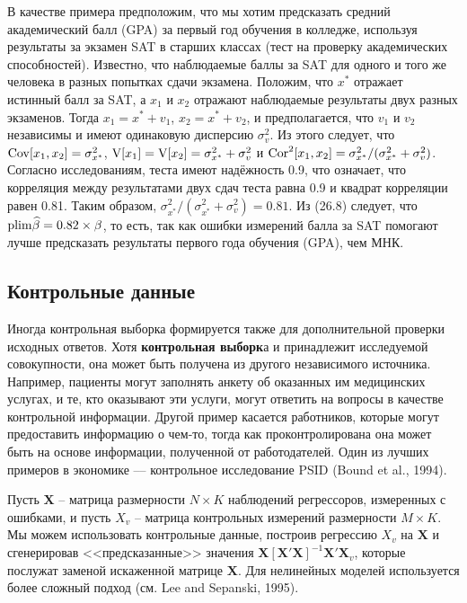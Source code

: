 В качестве примера предположим, что мы хотим предсказать средний академический балл (GPA) за первый год обучения в колледже, используя результаты за экзамен SAT в старших классах (тест на проверку академических способностей). Известно, что наблюдаемые баллы за SAT для одного и того же человека в разных попытках сдачи экзамена. Положим, что $x^*$ отражает истинный балл за SAT, а $x_1$ и $x_2$ отражают наблюдаемые результаты двух разных экзаменов. Тогда $x_1=x^*+v_1$, $x_2=x^*+v_2$, и предполагается, что $v_1$ и $v_2$ независимы и имеют одинаковую дисперсию $\sigma^2_v$. Из этого следует, что $\mathrm{Cov}[x_1, x_2]=\sigma^2_{x^*}$, $\mathrm{V}[x_1]=\mathrm{V}[x_2]=\sigma^2_{x^*}+\sigma^2_v$ и $\mathrm{Cor}^2[x_1,x_2]=\sigma^2_{x^*} / (\sigma^2_{x^*}+\sigma^2_v)$. Согласно исследованиям, теста имеют надёжность 0.9, что означает, что корреляция между результатами двух сдач теста равна 0.9 и квадрат корреляции равен 0.81. Таким образом, $\sigma^2_{x^*} / (\sigma^2_{x^*}+\sigma^2_v)=0.81$. Из (26.8) следует, что $\mathrm{plim } \widehat{\beta}=0.82 \times \beta$, то есть, так как ошибки измерений балла за SAT помогают лучше предсказать результаты первого года обучения (GPA), чем МНК.

\subsection{Контрольные данные} 
Иногда контрольная выборка формируется также для дополнительной проверки исходных ответов. Хотя {\bf контрольная выборк}а и принадлежит исследуемой совокупности, она может быть получена из другого независимого источника. Например, пациенты могут заполнять анкету об оказанных им медицинских услугах, и те, кто оказывают эти услуги, могут ответить на вопросы в качестве контрольной информации. Другой пример касается работников, которые могут предоставить информацию о чем-то, тогда как проконтролирована она может быть на основе информации, полученной от работодателей. Один из лучших примеров в экономике –-- контрольное исследование PSID (Bound et al., 1994).

Пусть $\mathbf{X}$ – матрица размерности $N \times K$ наблюдений регрессоров, измеренных с ошибками, и пусть $X_v$ – матрица контрольных измерений размерности $M \times K$. Мы можем использовать контрольные данные, построив регрессию $X_v$ на $\mathbf{X}$ и сгенерировав <<предсказанные>> значения $\mathbf{X[X'X]}^{-1} \mathbf{X'X}_v$, которые послужат заменой искаженной матрице $\mathbf{X}$. Для нелинейных моделей используется более сложный подход (см. Lee and Sepanski, 1995).

